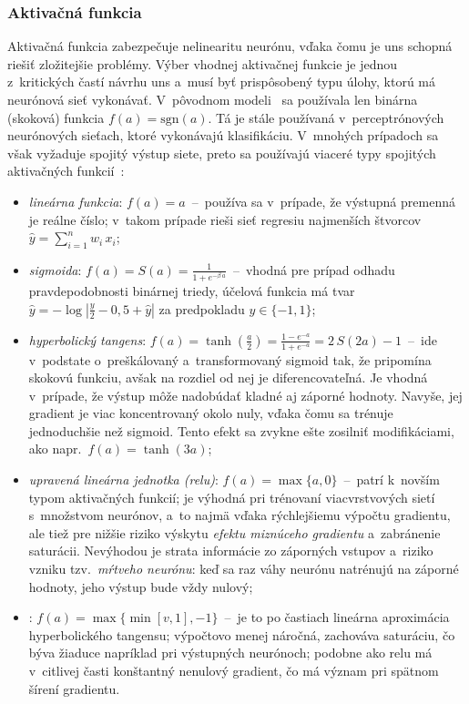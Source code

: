   \subsubsection{Aktivačná funkcia}

  Aktivačná funkcia zabezpečuje nelinearitu neurónu, vďaka čomu je \acrshort{uns} schopná riešiť zložitejšie problémy. Výber vhodnej aktivačnej funkcie je jednou z~kritických častí návrhu \acrshort{uns} a~musí byť prispôsobený typu úlohy, ktorú má neurónová sieť vykonávať. V~pôvodnom modeli~\cite{mccullochLogicalCalculusIdeas1943} sa používala len binárna (skoková) funkcia $f(a) = \mathrm{sgn}(a)$. Tá je stále používaná v~perceptrónových neurónových sieťach, ktoré vykonávajú klasifikáciu. V~mnohých prípadoch sa však vyžaduje spojitý výstup siete, preto sa používajú viaceré typy spojitých aktivačných funkcií~\cite{aggarwalNeuralNetworksDeep2018}:
  \begin{itemize}
    \item \emph{lineárna funkcia}: $f(a) = a$~--~používa sa v~prípade, že výstupná premenná je reálne číslo; v~takom prípade rieši sieť regresiu najmenších štvorcov $\hat y = \sum^n_{i=1} w_i\, x_i$;
    
    \item \emph{sigmoida}: $f(a) = S(a) = \frac{1}{1+e^{-\beta\, a}}$~--~vhodná pre prípad odhadu pravdepodobnosti binárnej triedy, účelová funkcia má tvar $\hat y = - \log \left|\frac{y}{2} - 0,5 + \hat y \right|$ za predpokladu $y \in \{-1, 1\}$;

    \item \emph{hyperbolický tangens}: $f(a) = \tanh \left(\frac{a}{2}\right) = \frac{1 - e^{-a}}{1+e^{-a}} = 2\, S(2a) - 1$~--~ide v~podstate o~preškálovaný a~transformovaný sigmoid tak, že pripomína skokovú funkciu, avšak na rozdiel od nej je diferencovateľná. Je vhodná v~prípade, že výstup môže nadobúdať kladné aj záporné hodnoty. Navyše, jej gradient je viac koncentrovaný okolo nuly, vďaka čomu sa trénuje jednoduchšie než sigmoid. Tento efekt sa zvykne ešte zosilniť modifikáciami, ako napr.\ $f(a) = \tanh(3a)$;
    
    \item \emph{upravená lineárna jednotka (\acrshort{relu})}: $f(a) = \max\{a, 0\}$~--~patrí k~novším typom aktivačných funkcií; je výhodná pri trénovaní viacvrstvových sietí s~množstvom neurónov, a~to najmä vďaka rýchlejšiemu výpočtu gradientu, ale tiež pre nižšie riziko výskytu \emph{efektu miznúceho gradientu} a~zabránenie saturácii. Nevýhodou je strata informácie zo záporných vstupov a~riziko vzniku tzv.~\emph{mŕtveho neurónu}: keď sa raz váhy neurónu natrénujú na záporné hodnoty, jeho výstup bude vždy nulový;
    
    \item \emph{}: $f(a) = \max \{ \min [v,1],-1\}$~--~je to po častiach lineárna aproximácia hyperbolického tangensu; výpočtovo menej náročná, zachováva saturáciu, čo býva žiaduce napríklad pri výstupných neurónoch; podobne ako \acrshort{relu} má v~citlivej časti konštantný nenulový gradient, čo má význam pri spätnom šírení gradientu.
  \end{itemize}

